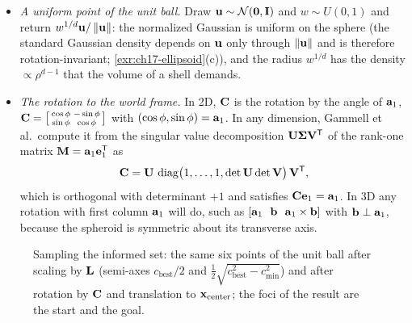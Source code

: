 \begin{itemize}
  \item \emph{A uniform point of the unit ball.} Draw
  $\mathbf{u}\sim\mathcal{N}(\mathbf{0},\mathbf{I})$ and $w\sim U(0,1)$ and return
  $w^{1/d}\mathbf{u}/\left\lVert \mathbf{u} \right\rVert$: the normalized Gaussian is uniform on
  the sphere (the standard Gaussian density depends on $\mathbf{u}$ only
  through $\left\lVert \mathbf{u} \right\rVert$ and is therefore rotation-invariant;
  \cref{exr:ch17-ellipsoid}(c)), and the radius $w^{1/d}$ has the density
  $\propto\rho^{d-1}$ that the volume of a shell demands.
  \item \emph{The rotation to the world frame.}
  In 2D, $\mathbf{C}$ is the rotation by the angle of $\mathbf{a}_1$,
  $\mathbf{C}=\bigl[\begin{smallmatrix}\cos\phi&-\sin\phi\\\sin\phi&\cos\phi\end{smallmatrix}\bigr]$
  with $(\cos\phi,\sin\phi)=\mathbf{a}_1$. In any dimension, Gammell et al.\
  compute it from the singular value decomposition
  $\mathbf{U}\mathbf{\Sigma}\mathbf{V}^{\mathsf{T}}$ of the rank-one matrix
  $\mathbf{M}=\mathbf{a}_1\mathbf{e}_1^{\mathsf{T}}$ as
  \begin{equation}
    \mathbf{C}=\mathbf{U}\,\operatorname{diag}\bigl(1,\dots,1,\det\mathbf{U}\det\mathbf{V}\bigr)\,\mathbf{V}^{\mathsf{T}},
    \label{eq:ch17-rotation}
  \end{equation}
  which is orthogonal with determinant $+1$ and satisfies
  $\mathbf{C}\mathbf{e}_1=\mathbf{a}_1$. In 3D any rotation with first column $\mathbf{a}_1$ will do, such as
  $[\vect{a}_1\ \ \vect{b}\ \ \vect{a}_1\times\vect{b}]$ with
  $\mathbf{b}\perp\mathbf{a}_1$, because the spheroid is symmetric about its
  transverse axis.
\end{itemize}

\begin{figure}[tb]
  \centering
  \caption{Sampling the informed set: the same six points of the unit
  ball after scaling by $\mathbf{L}$ (semi-axes $c_{\mathrm{best}}/2$ and
  $\frac12\sqrt{c_{\mathrm{best}}^2-c_{\min}^2}$) and after rotation by
  $\mathbf{C}$ and translation to $\mathbf{x}_{\mathrm{center}}$; the foci of the
  result are the start and the goal.}
  \label{fig:ch17-ellipse-transform}
\end{figure}

